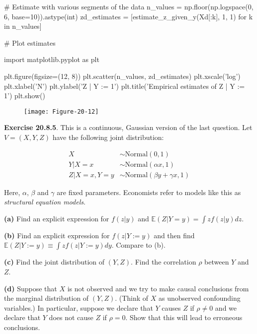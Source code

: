 \begin{python}
# Estimate with various segments of the data
n_values = np.floor(np.logspace(0, 6, base=10)).astype(int)
zd_estimates = [estimate_z_given_y(Xd[:k], 1, 1) for k in n_values]
\end{python}

\begin{python}
# Plot estimates

import matplotlib.pyplot as plt

plt.figure(figsize=(12, 8))
plt.scatter(n_values, zd_estimates)
plt.xscale('log')
plt.xlabel('N')
plt.ylabel('Z | Y := 1')
plt.title('Empirical estimates of Z | Y := 1')
plt.show()
\end{python}

\begin{figure}[H]
\texttt{[image: Figure-20-12]}
\end{figure}

\textbf{Exercise 20.8.5}. This is a continuous, Gaussian version of the
last question. Let \(V = (X, Y, Z)\) have the following joint
distribution:

\[
\begin{align}
X &\sim \text{Normal}(0, 1) \\
Y | X = x &\sim \text{Normal}(\alpha x, 1) \\
Z | X = x, Y = y &\sim \text{Normal}(\beta y + \gamma x, 1)
\end{align}
\]

Here, \(\alpha\), \(\beta\) and \(\gamma\) are fixed parameters.
Economists refer to models like this as \emph{structural equation
models}.

\textbf{(a)} Find an explicit expression for \(f(z | y)\) and
\(\mathbb{E}(Z | Y = y) = \int z f(z | y) dz\).

\textbf{(b)} Find an explicit expression for \(f(z | Y := y)\) and then
find \(\mathbb{E}(Z | Y := y) \equiv \int z f(z | Y := y) dy\). Compare
to (b).

\textbf{(c)} Find the joint distribution of \((Y, Z)\). Find the
correlation \(\rho\) between \(Y\) and \(Z\).

\textbf{(d)} Suppose that \(X\) is not observed and we try to make
causal conclusions from the marginal distribution of \((Y, Z)\). (Think
of \(X\) as unobserved confounding variables.) In particular, suppose we
declare that \(Y\) causes \(Z\) if \(\rho \neq 0\) and we declare that
\(Y\) does not cause \(Z\) if \(\rho = 0\). Show that this will lead to
erroneous conclusions.

